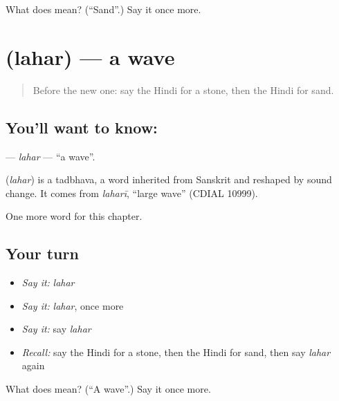 \begin{tcolorbox}[breakable,colback=teal!4,colframe=teal!35!black,title={Before you move on}]
What does  mean? (\textquotedblleft{}Sand\textquotedblright{}.) Say it once more.
\end{tcolorbox}
\section[\texorpdfstring{\hi{लहर} (lahar)}{लहर (lahar)}]{ (lahar) — a wave}

\label{lesson:HI-C144-lahar}



\begin{quote}
Before the new one: say the Hindi for a stone, then the Hindi for sand.
\end{quote}

\subsection*{You'll want to know: }
\textbf{} — \emph{lahar} — \textquotedblleft{}a wave\textquotedblright{}.

\begin{cousinweb}
\textbf{} (\emph{lahar}) is a tadbhava, a word inherited from Sanskrit and reshaped by sound change. It comes from \emph{laharī}, \textquotedblleft{}large wave\textquotedblright{} (CDIAL 10999).
\end{cousinweb}

\begin{grammarlens}[title={What you've built}]
One more word for this chapter.
\end{grammarlens}

\subsection*{Your turn}
\begin{itemize}
\raggedright
  \item \emph{Say it:} \emph{lahar}
  \item \emph{Say it:} \emph{lahar}, once more
  \item \emph{Say it:} say \emph{lahar}
  \item \emph{Recall:} say the Hindi for a stone, then the Hindi for sand, then say \emph{lahar} again
\end{itemize}

\begin{tcolorbox}[breakable,colback=teal!4,colframe=teal!35!black,title={Before you move on}]
What does  mean? (\textquotedblleft{}A wave\textquotedblright{}.) Say it once more.
\end{tcolorbox}
